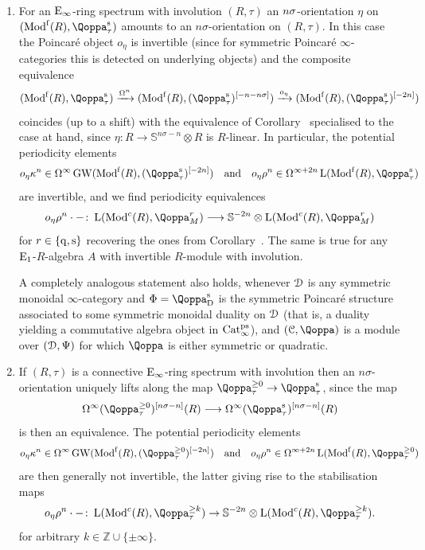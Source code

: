  



\begin{examples}\
\begin{enumerate}
\item
For an ${\mathrm{E}_{\infty}}$-ring spectrum with involution $(R,\tau)$ an $n\sigma$-orientation $\eta$ on $(\Modf{R},\QF^{\sym}_{\tau})$ amounts to an $n\sigma$-orientation on $(R,\tau)$. In this case the Poincaré object $o_{\eta}$ is invertible (since for symmetric Poincaré $\infty$-categories this is detected on underlying objects) and the composite equivalence
\[
(\Modf{R},\QF^{\sym}_{\tau}) \xrightarrow{\Om^n} (\Modf{R},(\QF^{\sym}_{\tau})\qshift{-n-n\sig}) \xrightarrow{o_{\eta}} (\Modf{R},(\QF^{\sym}_{\tau})\qshift{-2n})
\]
coincides (up to a shift) with the equivalence of Corollary~ specialised to the case at hand, since $\eta\colon R \rightarrow \mathbb S^{n\sigma-n} \otimes R$ is $R$-linear.
In particular, the potential periodicity elements 
\[
o_{\eta}\kappa^n \in \Om^{\infty}\GW(\Modf{R},(\QF^\sym_\tau)\qshift{-2n}) \quad \text{and} \quad o_{\eta}\rho^n \in \Om^{\infty+2n}\L(\Modf{R},\QF_\tau^\sym)
\]
are invertible, 
and we find periodicity equivalences 
\[
o_\eta\rho^n \cdot -\colon  \L(\Mod^c(R),\QF^r_M) \longrightarrow \SS^{-2n}\otimes \L(\Mod^c(R),\QF^r_{M})
\]
for $r \in \{\mathrm q,\mathrm{s}\}$ recovering the ones from Corollary~. The same is true for any ${\mathrm{E}_{1}}$-$R$-algebra $A$ with invertible $R$-module with involution.

A completely analogous statement also holds, whenever $\mathcal{D}$ is any symmetric monoidal $\infty$-category and $\Phi = \QF^{\sym}_{\Dual}$ is the symmetric Poincaré structure associated to some symmetric monoidal duality on $\mathcal{D}$ (that is, a duality yielding a commutative algebra object in $\mathrm{Cat}^\mathrm{ps}_\infty$), and $(\C,\QF)$ is a module over $(\mathcal{D},\Psi)$ for which $\QF$ is either symmetric or quadratic. 
\item
If $(R,\tau)$ is a connective ${\mathrm{E}_{\infty}}$-ring spectrum with involution then an $n\sigma$-orientation uniquely lifts along the map $\QF_\tau^{\geq 0} \rightarrow \QF_\tau^\sym$, since the map
\[
\Omega^\infty (\QF_{\tau}^{\geq 0})\qshift{n\sigma-n}(R) \longrightarrow \Omega^\infty (\QF_{\tau}^{\sym})\qshift{n\sigma-n}(R)
\]
is then an equivalence. The potential periodicity elements 
\[
o_{\eta}\kappa^n \in \Om^{\infty}\GW(\Modf{R},(\QF^{\geq 0}_\tau)\qshift{-2n}) \quad \text{and} \quad o_{\eta}\rho^n \in \Om^{\infty+2n}\L(\Modf{R},\QF_\tau^{\geq 0})
\]
are then generally not invertible, the latter giving rise to the stabilisation maps
\[
o_{\eta}\rho^n \cdot - \colon \L(\Mod^c(R),\QF^{\geq k}_{\tau}) \to \SS^{-2n}\otimes \L(\Mod^c(R),\QF^{\geq k}_{\tau}).
\]
for arbitrary $k \in \mathbb Z \cup \{\pm \infty\}$. 


\end{enumerate}
\end{examples}

